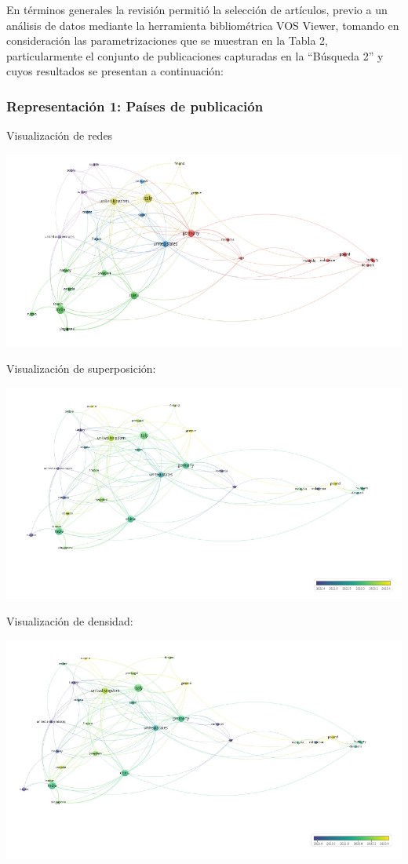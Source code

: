 \documentclass{article}
\begin{document}
En términos generales la revisión permitió la selección de artículos,
previo a un análisis de datos mediante la herramienta bibliométrica VOS
Viewer, tomando en consideración las parametrizaciones que se muestran
en la Tabla 2, particularmente el conjunto de publicaciones capturadas
en la ``Búsqueda 2'' y cuyos resultados se presentan a continuación:

\subsubsection{Representación 1: Países de
publicación}\label{representaciuxf3n-1-pauxedses-de-publicaciuxf3n}

Visualización de redes

\includegraphics{images/clipboard-216749494.png}

Visualización de superposición:

\includegraphics{images/clipboard-3689379518.png}

Visualización de densidad:

\includegraphics{images/clipboard-3221714897.png}
\end{document}
